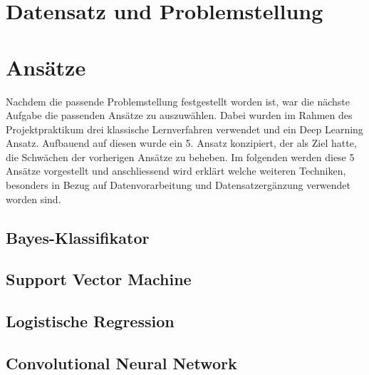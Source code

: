 \documentclass[researchlab,palatino]{AIGpaper}
\begin{document}
\section{Datensatz und Problemstellung}
\label{Datensatz}




\section{Ansätze}
\label{Ansätze}
Nachdem die passende Problemstellung festgestellt worden ist, war die nächste Aufgabe die passenden Ansätze zu auszuwählen. Dabei wurden im Rahmen des Projektpraktikum drei klassische Lernverfahren verwendet und ein Deep Learning Ansatz. Aufbauend auf diesen wurde ein 5. Ansatz konzipiert, der als Ziel hatte, die Schwächen der vorherigen Ansätze zu beheben. Im folgenden werden diese 5 Ansätze vorgestellt und anschliessend wird erklärt welche weiteren Techniken, besonders in Bezug auf Datenvorarbeitung und Datensatzergänzung verwendet worden sind.

\subsection{Bayes-Klassifikator}
\label{Bayes-Klassifikator}


\subsection{Support Vector Machine}
\label{SVM}
 



\subsection{Logistische Regression}
\label{Logistische Regression}
 



\subsection{Convolutional Neural Network}
\label{CNN}
 
\end{document}
